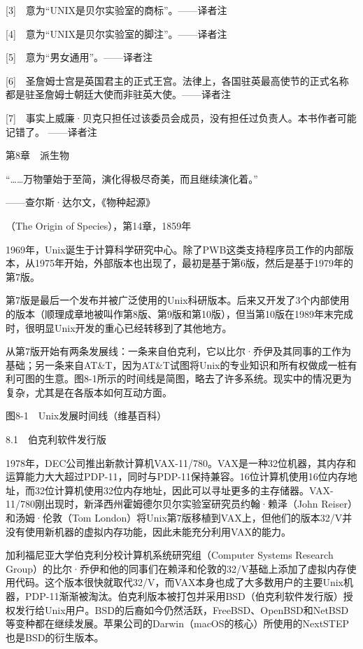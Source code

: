 \documentclass[a4paper,12pt,UTF8,twoside]{ctexbook}
\begin{document}
{{[3]　意为“UNIX是贝尔实验室的商标”。——译者注

[4]　意为“UNIX是贝尔实验室的脚注”。——译者注

[5]　意为“男女通用”。——译者注

[6]　圣詹姆士宫是英国君主的正式王宫。法律上，各国驻英最高使节的正式名称都是驻圣詹姆士朝廷大使而非驻英大使。——译者注

[7]　事实上威廉·贝克只担任过该委员会成员，没有担任过负责人。本书作者可能记错了。 ——译者注





第8章　派生物


“……万物肇始于至简，演化得极尽奇美，而且继续演化着。”

——查尔斯·达尔文，《物种起源》

（The Origin of Species），第14章，1859年

1969年，Unix诞生于计算科学研究中心。除了PWB这类支持程序员工作的内部版本，从1975年开始，外部版本也出现了，最初是基于第6版，然后是基于1979年的第7版。

第7版是最后一个发布并被广泛使用的Unix科研版本。后来又开发了3个内部使用的版本（顺理成章地被叫作第8版、第9版和第10版），但当第10版在1989年末完成时，很明显Unix开发的重心已经转移到了其他地方。

从第7版开始有两条发展线：一条来自伯克利，它以比尔·乔伊及其同事的工作为基础；另一条来自AT\&T，因为AT\&T试图将Unix的专业知识和所有权做成一桩有利可图的生意。图8-1所示的时间线是简图，略去了许多系统。现实中的情况更为复杂，尤其是在各版本如何互动方面。



图8-1　Unix发展时间线（维基百科）





8.1　伯克利软件发行版


1978年，DEC公司推出新款计算机VAX-11/780。VAX是一种32位机器，其内存和运算能力大大超过PDP-11，同时与PDP-11保持兼容。16位计算机使用16位内存地址，而32位计算机使用32位内存地址，因此可以寻址更多的主存储器。VAX-11/780刚出现时，新泽西州霍姆德尔贝尔实验室研究员约翰·赖泽（John Reiser）和汤姆·伦敦（Tom London）将Unix第7版移植到VAX上，但他们的版本32/V并没有使用新机器的虚拟内存功能，因此未能充分利用VAX的能力。

加利福尼亚大学伯克利分校计算机系统研究组（Computer Systems Research Group）的比尔·乔伊和他的同事们在赖泽和伦敦的32/V基础上添加了虚拟内存使用代码。这个版本很快就取代32/V，而VAX本身也成了大多数用户的主要Unix机器，PDP-11渐渐被淘汰。伯克利版本被打包并采用BSD（伯克利软件发行版）授权发行给Unix用户。BSD的后裔如今仍然活跃，FreeBSD、OpenBSD和NetBSD等变种都在继续发展。苹果公司的Darwin（macOS的核心）所使用的NextSTEP也是BSD的衍生版本。

}}
\end{document}

